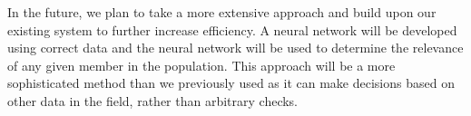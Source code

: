 \documentclass[conference]{IEEEtran}
\begin{document}
In the future, we plan to take a more extensive approach and build upon our existing system to further increase efficiency. A neural network will be developed using correct data and the neural network will be used to determine the relevance of any given member in the population. This approach will be a more sophisticated method than we previously used as it can make decisions based on other data in the field, rather than arbitrary checks.  

%
%



%
%
\end{document}
